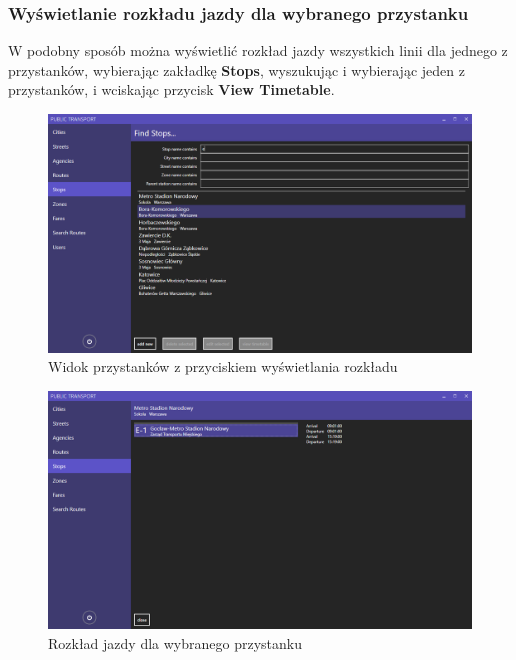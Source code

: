 \documentclass[10pt,a4paper]{article}
\begin{document}
\subsubsection{Wyświetlanie rozkładu jazdy dla wybranego przystanku}
W podobny sposób można wyświetlić rozkład jazdy wszystkich linii dla jednego z przystanków, wybierając zakładkę \textbf{Stops}, wyszukując i wybierając jeden z przystanków, i wciskając przycisk \textbf{View Timetable}.
\begin{figure}[H]
	\centering
	\includegraphics[width=15cm]{Resources/Images/13_filter_stops.png}
	\caption{Widok przystanków z przyciskiem wyświetlania rozkładu}
\end{figure}
\begin{figure}[H]
	\centering
	\includegraphics[width=15cm]{Resources/Images/22_stop_timetable.PNG}
	\caption{Rozkład jazdy dla wybranego przystanku}
\end{figure}
\end{document}
